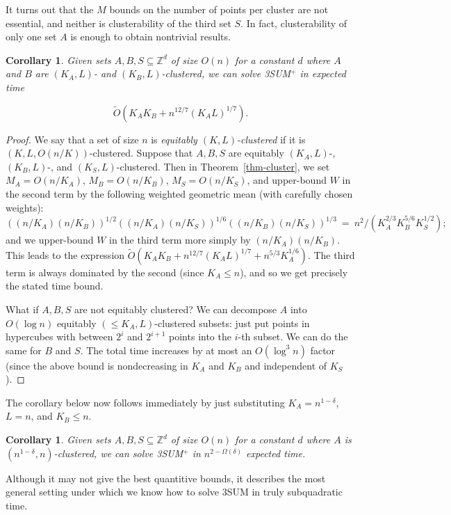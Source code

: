 \documentclass[11pt]{article}
\newtheorem{corollary}[theorem]{Corollary}
\newcommand{\Z}{\mathbb{Z}}
\newcommand{\OO}{\widetilde{O}}
\begin{document}
It turns out that the $M$ bounds on the number of points
per cluster are not essential, and neither is clusterability
of the third set $S$.  In fact, clusterability of only one
set $A$ is enough to obtain nontrivial results.

\begin{corollary}\label{cor-cluster}
Given sets $A,B,S\subseteq\Z^d$ of size $O(n)$ for a constant $d$ where
$A$ and $B$ are $(K_A,L)$- and $(K_B,L)$-clustered,
we can solve 3SUM$^+$ in expected time

$$\OO(K_AK_B + n^{12/7}(K_AL)^{1/7}).$$
\end{corollary}
\begin{proof}
We say that a set of size $n$ is \emph{equitably $(K,L)$-clustered} if
it is $(K,L,O(n/K))$-clustered.  Suppose that $A,B,S$
are equitably  $(K_A,L)$-, $(K_B,L)$-, and $(K_S,L)$-clustered.
Then in Theorem~\ref{thm-cluster}, we set $M_A=O(n/K_A)$,
$M_B=O(n/K_B)$, $M_S=O(n/K_S)$, and
upper-bound $W$ in the second term by the following
weighted geometric mean
(with carefully chosen weights):
\[ ((n/K_A)(n/K_B))^{1/2} ((n/K_A)(n/K_S))^{1/6} ((n/K_B)(n/K_S))^{1/3} \:=\: n^2/(K_A^{2/3}K_B^{5/6}K_S^{1/2});
\]
and we upper-bound $W$ in the third term more simply by $(n/K_A)(n/K_B)$.
This leads to the expression
$\OO(K_AK_B + n^{12/7}(K_A L)^{1/7} + n^{5/3}K_A^{1/6})$.
The third term is always dominated by the second (since $K_A\le n$),
and so we get precisely the stated time bound.

What if $A,B,S$ are not equitably clustered?
We can decompose $A$ into $O(\log n)$
equitably $(\le K_A,L)$-clustered subsets: just put points in
hypercubes with between $2^i$ and $2^{i+1}$ points into the $i$-th
subset.  We can do the same for $B$ and $S$.
The total time increases by at most an $O(\log^3 n)$ factor
(since the above bound is nondecreasing in $K_A$ and $K_B$
and independent of $K_S$).
\end{proof}

The corollary below now follows immediately by
just substituting $K_A=n^{1-\delta}$, $L=n$, and $K_B\le n$.

\begin{corollary}\label{cor-general}
Given sets $A,B,S\subseteq\Z^d$ of size $O(n)$ for a constant $d$ where
$A$ is $(n^{1-\delta},n)$-clustered,
we can solve 3SUM$^+$ in $n^{2-\Omega(\delta)}$ expected time.
\end{corollary}

Although it may not give the best quantitive bounds, it
describes the most general setting under which
we know how to solve 3SUM in truly subquadratic time.
\end{document}
